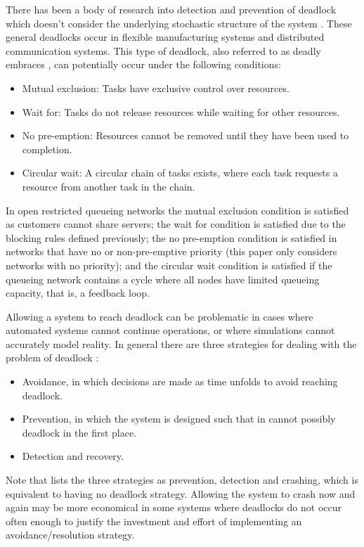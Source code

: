 \documentclass{article}
\numberwithin{equation}{section}
\begin{document}
There has been a body of research into detection and prevention of deadlock
which doesn't consider the underlying stochastic structure of the system
\cite{coffmanelphick71, reveliotis15a, reveliotis15b}.
These general deadlocks occur in flexible manufacturing systems and
distributed communication systems.
This type of deadlock, also referred to as deadly embraces
\cite{coffmanelphick71}, can potentially occur under the following conditions:
\begin{itemize}
  \item Mutual exclusion: Tasks have exclusive control over resources.
  \item Wait for: Tasks do not release resources while waiting for other
  resources.
  \item No pre-emption: Resources cannot be removed until they have been used
  to completion.
  \item Circular wait: A circular chain of tasks exists, where each task
  requests a resource from another task in the chain.
\end{itemize}

In open restricted queueing networks the mutual exclusion condition is
satisfied as customers cannot share servers; the wait for condition is
satisfied due to the blocking rules defined previously; the no pre-emption
condition is satisfied in networks that have no or non-pre-emptive priority
(this paper only considers networks with no priority); and the circular wait
condition is satisfied if the queueing network contains a cycle where all
nodes have limited queueing capacity, that is, a feedback loop.

Allowing a system to reach deadlock can be problematic in cases where
automated systems cannot continue operations, or where simulations cannot
accurately model reality.
In general there are three strategies for dealing with the problem of deadlock
\cite{kawadkaretal14, elmagarmid86, venkateshsmith05, vis06}:

\begin{itemize}
  \item Avoidance, in which decisions are made as time unfolds to avoid
  reaching deadlock.
  \item Prevention, in which the system is designed such that in cannot
  possibly deadlock in the first place.
  \item Detection and recovery.
\end{itemize}

Note that \cite{holt72} lists the three strategies as prevention, detection
and crashing, which is equivalent to having no deadlock strategy.
Allowing the system to crash now and again may be more economical in some
systems where deadlocks do not occur often enough to justify the investment
and effort of implementing an avoidance/resolution strategy.
\end{document}
